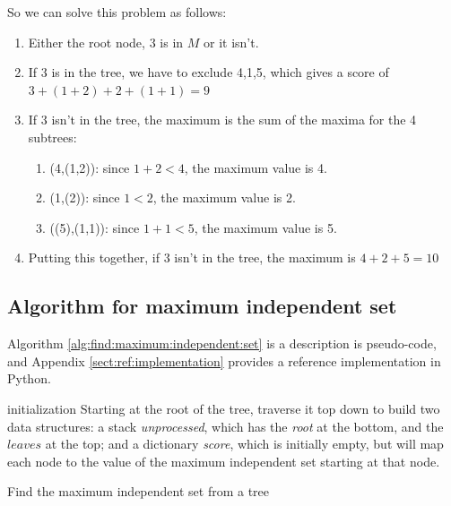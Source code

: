 \documentclass[]{article}
\begin{document}
So we can solve this problem as follows:
\begin{enumerate}
	\item Either the root node, $3$ is in $M$ or it isn't.
	\item If $3$ is in the tree, we have to exclude {4,1,5}, which gives a score of $3+(1+2)+2+(1+1)=9$
	\item If $3$ isn't in the tree, the maximum is the sum of the maxima for the 4 subtrees:
	\begin{enumerate}
		\item (4,(1,2)): since $1+2<4$, the maximum value is 4.
		\item (1,(2)): since $1<2$, the maximum value is 2. 
		\item ((5),(1,1)): since $1+1<5$, the maximum value is 5.
	\end{enumerate}
	\item Putting this together, if $3$ isn't in the tree, the maximum is $4+2+5=10$
\end{enumerate}

\subsection{Algorithm for maximum independent set}

Algorithm \ref{alg:find:maximum:independent:set} is a description is pseudo-code, and Appendix \ref{sect:ref:implementation} provides a reference implementation in Python.

\begin{algorithm}[H]
	initialization\;
	Starting at the root of the tree, traverse it top down to build two data structures: a stack \emph{unprocessed}, which has the \emph{root} at the bottom, and the $leaves$ at the top; and a dictionary \emph{score}, which is initially empty, but will map each node to the value of the maximum independent set starting at that node.\;
	\caption{Find the maximum independent set from a tree}\label{alg:find:maximum:independent:set}
\end{algorithm}
\end{document}
